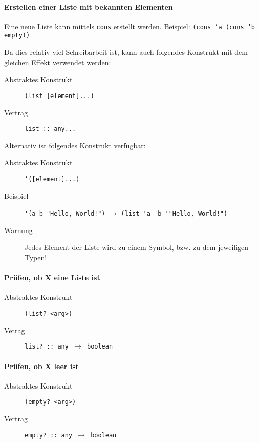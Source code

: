             \paragraph{Erstellen einer Liste mit bekannten Elementen}
                Eine neue Liste kann mittels \texttt{cons} erstellt werden. Beispiel: \texttt{(cons 'a (cons 'b empty))}

                Da dies relativ viel Schreibarbeit ist, kann auch folgendes Konstrukt mit dem gleichen Effekt verwendet werden:
                \begin{description}
                    \item[Abstraktes Konstrukt] \texttt{(list [element]...)}
                    \item[Vertrag] \texttt{list :: any...}
                \end{description}

                Alternativ ist folgendes Konstrukt verfügbar:
                \begin{description}
                    \item[Abstraktes Konstrukt] \texttt{'([element]...)}
                    \item[Beispiel] \verb$'(a b "Hello, World!")$ $ \rightarrow $ \verb$(list 'a 'b '"Hello, World!")$
                    \item[Warnung] Jedes Element der Liste wird zu einem Symbol, bzw. zu dem jeweiligen Typen!
                \end{description}

            \paragraph{Prüfen, ob X eine Liste ist}
                \begin{description}
                    \item[Abstraktes Konstrukt] \texttt{(list? <arg>)}
                    \item[Vetrag] \texttt{list? :: any $ \rightarrow $ boolean}
                \end{description}

            \paragraph{Prüfen, ob X leer ist}
                \begin{description}
                    \item[Abstraktes Konstrukt] \texttt{(empty? <arg>)}
                    \item[Vertrag] \texttt{empty? :: any $ \rightarrow $ boolean}
                \end{description}



